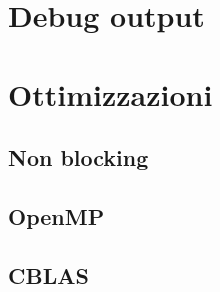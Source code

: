\section{Debug output}

\section{Ottimizzazioni}

\subsection{Non blocking}

\subsection{OpenMP}

\subsection{CBLAS}
